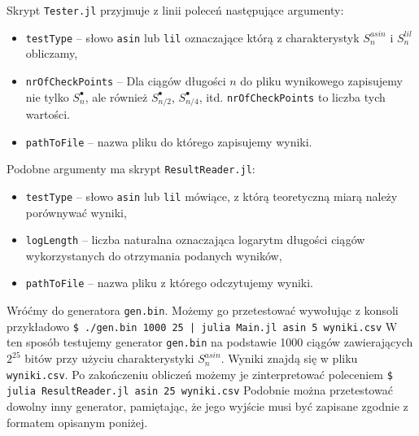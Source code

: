 \documentclass[a4paper,11pt,twoside]{book}
\newcommand{\Slil}[1]{S^{lil}_#1}
\newcommand{\Sasin}[1]{S^{asin}_#1}
\theoremstyle{definition}
\begin{document}
Skrypt \texttt{Tester.jl} przyjmuje z linii poleceń następujące argumenty:
\begin{itemize}
 \item \texttt{testType} -- słowo \texttt{asin} lub \texttt{lil} oznaczające którą z charakterystyk $\Sasin{n}$ i $\Slil{n}$ obliczamy,
 \item \texttt{nrOfCheckPoints} -- Dla ciągów długości $n$ do pliku wynikowego zapisujemy nie tylko $S^{\bullet}_{n}$, ale również $S^{\bullet}_{n/2}$, $S^{\bullet}_{n/4}$, itd.  \texttt{nrOfCheckPoints} to liczba tych wartości.
 \item \texttt{pathToFile} -- nazwa pliku do którego zapisujemy wyniki.
\end{itemize}
Podobne argumenty ma skrypt \texttt{ResultReader.jl}:
\begin{itemize}
 \item \texttt{testType} -- słowo \texttt{asin} lub \texttt{lil} mówiące, z którą teoretyczną miarą należy porównywać wyniki,
 \item \texttt{logLength} -- liczba naturalna oznaczająca logarytm długości ciągów wykorzystanych do otrzymania podanych wyników,
 \item \texttt{pathToFile} -- nazwa pliku z którego odczytujemy wyniki.
\end{itemize}
Wróćmy do generatora \texttt{gen.bin}. Możemy go przetestować wywołując z konsoli przykładowo \newline
\texttt{\hspace*{20pt}\$ ./gen.bin 1000 25 | julia Main.jl asin 5 wyniki.csv}\newline
\noindent W ten sposób testujemy generator \texttt{gen.bin} na podstawie 1000 ciągów zawierających $2^{25}$ bitów przy użyciu charakterystyki $\Sasin{n}$. Wyniki znajdą się w pliku \texttt{wyniki.csv}. Po zakończeniu obliczeń możemy je zinterpretować poleceniem \newline
  \texttt{\hspace*{20pt}\$ julia ResultReader.jl asin 25 wyniki.csv} \newline
Podobnie można przetestować dowolny inny generator, pamiętając, że jego wyjście musi być zapisane zgodnie z formatem opisanym poniżej.
\end{document}
